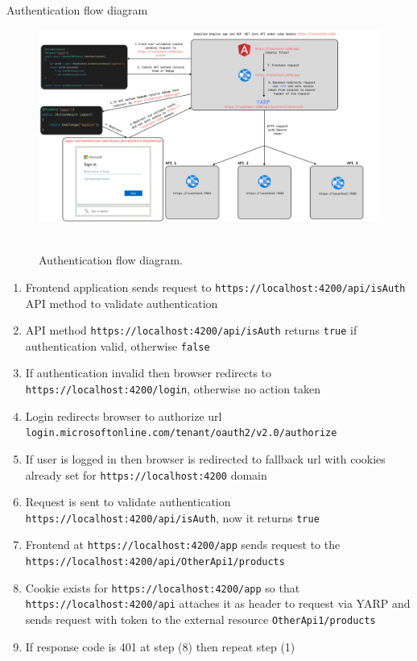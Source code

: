 Authentication flow diagram
\begin{figure}[H]
    \centering
    \includegraphics[width=1\textwidth]{img/Auth_flow_updated}
    ~\caption{Authentication flow diagram.}\label{fig:authentication_flow_diagram}
\end{figure}

\begin{enumerate}
    \item Frontend application sends request to \texttt{https://localhost:4200/api/isAuth} API method to validate authentication
    \item API method \texttt{https://localhost:4200/api/isAuth} returns \texttt{true} if authentication valid, otherwise \texttt{false}
    \item If authentication invalid then browser redirects to \texttt{https://localhost:4200/login}, otherwise no action taken
    \item Login redirects browser to authorize url \\
    \texttt{login.microsoftonline.com/tenant/oauth2/v2.0/authorize}
    \item If user is logged in then browser is redirected to fallback url with cookies already set for \texttt{https://localhost:4200} domain
    \item Request is sent to validate authentication \texttt{https://localhost:4200/api/isAuth}, now it returns \texttt{true}
    \item Frontend at \texttt{https://localhost:4200/app} sends request to the \\ \texttt{https://localhost:4200/api/OtherApi1/products}
    \item Cookie exists for \texttt{https://localhost:4200/app} so that \\ \texttt{https://localhost:4200/api}
    attaches it as header to request via YARP and sends request with token to the external resource \texttt{OtherApi1/products}
    \item If response code is 401 at step (8) then repeat step (1)
\end{enumerate}